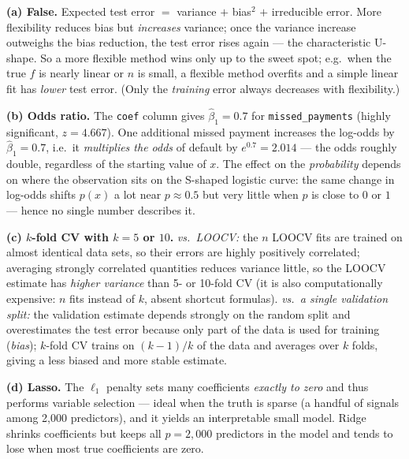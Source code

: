 \documentclass[11pt,a4paper]{article}
\begin{document}
\ifdefined\withsolutions
\begin{solutionbox}
\textbf{(a) False.}
Expected test error $=$ variance $+$ bias$^2$ $+$ irreducible error. More flexibility reduces
bias but \emph{increases} variance; once the variance increase outweighs the bias reduction,
the test error rises again --- the characteristic U-shape. So a more flexible method wins only
up to the sweet spot; e.g.\ when the true $f$ is nearly linear or $n$ is small, a flexible
method overfits and a simple linear fit has \emph{lower} test error. (Only the \emph{training}
error always decreases with flexibility.)

\medskip
\textbf{(b) Odds ratio.}
The \texttt{coef} column gives $\hat{\beta}_1=0.7$ for \texttt{missed\_payments} (highly
significant, $z=4.667$). One additional missed payment increases the log-odds by
$\hat{\beta}_1=0.7$, i.e.\ it \emph{multiplies the odds} of default by $e^{0.7}=2.014$ --- the
odds roughly double, regardless of the starting value of $x$.
The effect on the \emph{probability} depends on where the observation sits on the S-shaped
logistic curve: the same change in log-odds shifts $p(x)$ a lot near $p\approx 0.5$ but very
little when $p$ is close to $0$ or $1$ --- hence no single number describes it.

\medskip
\textbf{(c) $k$-fold CV with $k=5$ or $10$.}
\emph{vs.\ LOOCV:} the $n$ LOOCV fits are trained on almost identical data sets, so their
errors are highly positively correlated; averaging strongly correlated quantities reduces
variance little, so the LOOCV estimate has \emph{higher variance} than 5- or 10-fold CV
(it is also computationally expensive: $n$ fits instead of $k$, absent shortcut formulas).
\emph{vs.\ a single validation split:} the validation estimate depends strongly on the random
split and overestimates the test error because only part of the data is used for training
(\emph{bias}); $k$-fold CV trains on $(k-1)/k$ of the data and averages over $k$ folds, giving
a less biased and more stable estimate.

\medskip
\textbf{(d) Lasso.}
The $\ell_1$ penalty sets many coefficients \emph{exactly to zero} and thus performs variable
selection --- ideal when the truth is sparse (a handful of signals among 2{,}000 predictors),
and it yields an interpretable small model. Ridge shrinks coefficients but keeps all
$p=2{,}000$ predictors in the model and tends to lose when most true coefficients are zero.


\end{solutionbox}
\end{document}
